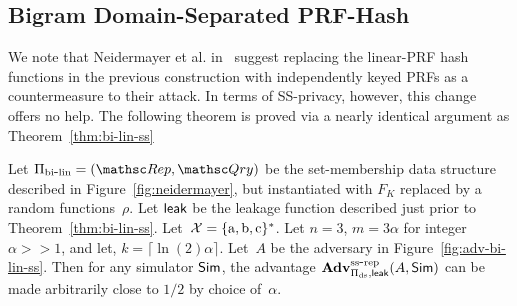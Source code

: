 \subsection{Bigram Domain-Separated PRF-Hash}
We note that Neidermayer et al. in~\cite{xxx} suggest replacing the linear-PRF hash functions in the previous construction with independently keyed PRFs as a countermeasure to their attack.  In terms of SS-privacy, however, this change offers no help.  The following theorem is proved via a nearly identical argument as Theorem~\ref{thm:bi-lin-ss}

\begin{theorem}\label{thm:bi-ds-ss}
Let $\setprim_{\bilin}= (\Rep, \Qry)$ be the set-membership data structure described in Figure~\ref{fig:neidermayer}, but instantiated with $F_{K}$ replaced by a random functions~$\rho$.  Let ${\sf leak}$ be the leakage function described just prior to Theorem~\ref{thm:bi-lin-ss}.   Let~${\cal X}=\{\mathrm{a,b,c}\}^*$. Let $n=3$,  $m=3\alpha $ for integer $\alpha >> 1$, and let, $k = \lceil \ln(2) \alpha \rceil$.  Let~$A$ be the adversary in Figure~\ref{fig:adv-bi-lin-ss}.  Then for any simulator ${\sf Sim}$,
the advantage $\mathrm{\mathbf{Adv}}^{\mathrm{ss\mbox{-}rep}}_{\Pi_{\mathrm{ds}},{\sf leak}}(A,{\sf Sim})$ can be made arbitrarily close to $1/2$ by choice of~$\alpha$.
\end{theorem}


